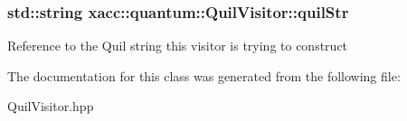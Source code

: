 \subsubsection[{\texorpdfstring{quil\+Str}{quilStr}}]{\setlength{\rightskip}{0pt plus 5cm}std\+::string xacc\+::quantum\+::\+Quil\+Visitor\+::quil\+Str\hspace{0.3cm}{\ttfamily [protected]}}\hypertarget{a00051_afd04300ce4dab03448a09f9bee448ca6}{}\label{a00051_afd04300ce4dab03448a09f9bee448ca6}
Reference to the Quil string this visitor is trying to construct 

The documentation for this class was generated from the following file\+:\begin{DoxyCompactItemize}
\item 
Quil\+Visitor.\+hpp\end{DoxyCompactItemize}
